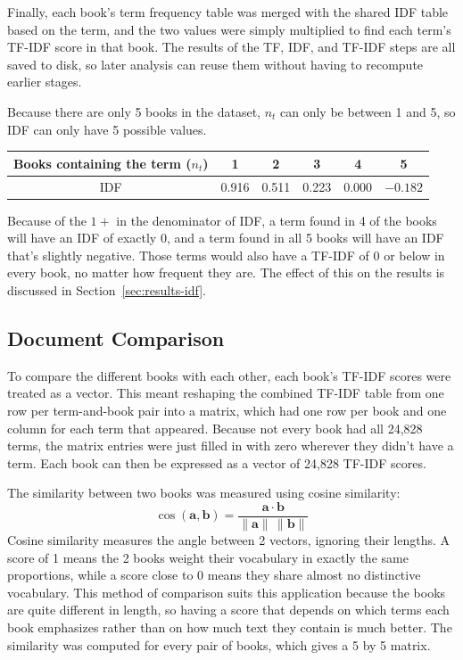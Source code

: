 \documentclass[11pt]{article}
\begin{document}
Finally, each book's term frequency table was merged with the shared IDF table based on the term, and the two values were simply multiplied to find each term's TF-IDF score in that book.
The results of the TF, IDF, and TF-IDF steps are all saved to disk, so later analysis can reuse them without having to recompute earlier stages.

Because there are only 5 books in the dataset, $n_t$ can only be between 1 and 5, so IDF can only have 5 possible values.
\begin{center}
\begin{tabular}{cccccc}
    \toprule
    Books containing the term ($n_t$) & 1 & 2 & 3 & 4 & 5 \\
    \midrule
    IDF & 0.916 & 0.511 & 0.223 & 0.000 & $-0.182$ \\
    \bottomrule
\end{tabular}
\end{center}
Because of the $1 +$ in the denominator of IDF, a term found in 4 of the books will have an IDF of exactly 0, and a term found in all 5 books will have an IDF that's slightly negative.
Those terms would also have a TF-IDF of 0 or below in every book, no matter how frequent they are.
The effect of this on the results is discussed in Section~\ref{sec:results-idf}.

\subsection{Document Comparison}
\label{sec:comparison}

To compare the different books with each other, each book's TF-IDF scores were treated as a vector.
This meant reshaping the combined TF-IDF table from one row per term-and-book pair into a matrix, which had one row per book and one column for each term that appeared.
Because not every book had all 24,828 terms, the matrix entries were just filled in with zero wherever they didn't have a term.
Each book can then be expressed as a vector of 24,828 TF-IDF scores.

The similarity between two books was measured using cosine similarity:
\begin{equation}
	\cos(\mathbf{a}, \mathbf{b}) = \frac{\mathbf{a} \cdot \mathbf{b}}{\lVert \mathbf{a} \rVert \, \lVert \mathbf{b} \rVert}
\end{equation}
Cosine similarity measures the angle between 2 vectors, ignoring their lengths.
A score of 1 means the 2 books weight their vocabulary in exactly the same proportions, while a score close to 0 means they share almost no distinctive vocabulary.
This method of comparison suits this application because the books are quite different in length, so having a score that depends on which terms each book emphasizes rather than on how much text they contain is much better.
The similarity was computed for every pair of books, which gives a 5 by 5 matrix.
\end{document}

